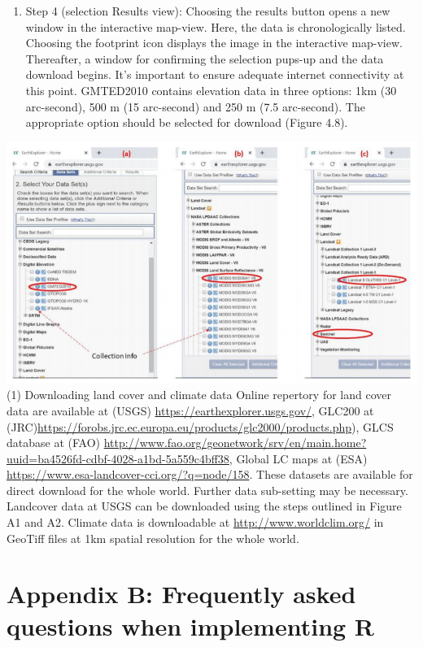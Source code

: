 \documentclass[
  10pt,
  b5paper,
]{book}
\providecommand{\tightlist}{%
  \setlength{\itemsep}{0pt}\setlength{\parskip}{0pt}}
\begin{document}
\begin{enumerate}
\def\labelenumi{\arabic{enumi}.}
\setcounter{enumi}{3}
\tightlist
\item
  Step 4 (selection Results view): Choosing the results button opens a new window in the interactive map-view. Here, the data is chronologically listed. Choosing the footprint icon displays the image in the interactive map-view. Thereafter, a window for confirming the selection pups-up and the data download begins. It's important to ensure adequate internet connectivity at this point. GMTED2010 contains elevation data in three options: 1km (30 arc-second), 500 m (15 arc-second) and 250 m (7.5 arc-second). The appropriate option should be selected for download (Figure 4.8).
\end{enumerate}

\includegraphics{figures/images/FigureA2.png}
(1) Downloading land cover and climate data
Online repertory for land cover data are available at (USGS) \url{https://earthexplorer.usgs.gov/}, GLC200 at (JRC)\url{https://forobs.jrc.ec.europa.eu/products/glc2000/products.php}), GLCS database at (FAO) \url{http://www.fao.org/geonetwork/srv/en/main.home?uuid=ba4526fd-cdbf-4028-a1bd-5a559c4bff38}, Global LC maps at (ESA) \url{https://www.esa-landcover-cci.org/?q=node/158}. These datasets are available for direct download for the whole world. Further data sub-setting may be necessary. Landcover data at USGS can be downloaded using the steps outlined in Figure A1 and A2.
Climate data is downloadable at \url{http://www.worldclim.org/} in GeoTiff files at 1km spatial resolution for the whole world.

\hypertarget{appendix-b-frequently-asked-questions-when-implementing-r}{%
\section*{Appendix B: Frequently asked questions when implementing R}\label{appendix-b-frequently-asked-questions-when-implementing-r}}
\end{document}
